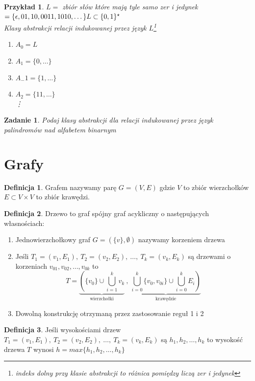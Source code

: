 \documentclass[12pt,a4paper]{article}
\newtheorem{przyklad}{Przykład}
\newtheorem{zad}{Zadanie}
\theoremstyle{definition}
\newtheorem{df}{Definicja}
\theoremstyle{remark}
\begin{document}
	\begin{przyklad}
		$L = $ zbiór słów które mają tyle samo zer i jedynek $ = \{\epsilon, 01, 10, 0011, 1010, \dots\}\\
		L \subset \{0, 1\}^\star$\\
		Klasy abstrakcji relacji indukowanej przez język $L$\footnote{indeks dolny przy klasie abstrakcji to różnica pomiędzy liczą zer i jedynek}
		\begin{enumerate}
			\item $A_0 = L$
			\item $A_1 = \{0, \dots \}$
			\item $A_-1 = \{1, \dots \}$
			\item $A_2 = \{11, \dots \}$\\
			\vdots
		\end{enumerate}
	\end{przyklad}
	\begin{zad}
		Podaj klasy abstrakcji dla relacji indukowanej przez język palindromów nad alfabetem binarnym
	\end{zad}

\section{Grafy}
	
	\begin{df}
		Grafem nazywamy parę $G = (V, E)$ gdzie $V$ to zbiór wierzchołków $E \subset V \times V$ to zbiór krawędzi.
	\end{df}	

	\begin{df}
		Drzewo to graf spójny graf acykliczny o następujących własnościach:
		\begin{enumerate}
			\item Jednowierzchołkowy graf $G = (\{v\}, \emptyset)$ nazywamy korzeniem drzewa
			\item Jeśli $T_1 = (v_1, E_1), ~ T_2 = (v_2, E_2), ~\dots ,~ T_k = (v_k, E_k)$ są drzewami o korzeniach $v_{01}, v_{02}, \dots, v_{0k}$
			to $$T = \underbrace{ \left(\{v_0\} \cup \bigcup^k_{i=1}v_k \right. }_\text{wierzchołki} ~,~
					\underbrace{ \left. \bigcup_{i=0}^k \{v_0, v_{0i}\} \cup \bigcup_{i=0}^k E_i \right) }_\text{krawędzie}$$
			\item Dowolną konstrukcję otrzymaną przez zastosowanie reguł 1 i 2
		\end{enumerate}			
	\end{df}
	
	\begin{df}
		Jeśli wysokościami drzew $T_1 = (v_1, E_1), ~ T_2 = (v_2, E_2), ~\dots ,~ T_k = (v_k, E_k)$ są $h_1, h_2, \dots , h_k$ to
		wysokość drzewa $T$ wynosi $h = max\{h_1, h_2, \dots , h_k\}$
	\end{df}
	
\end{document}
